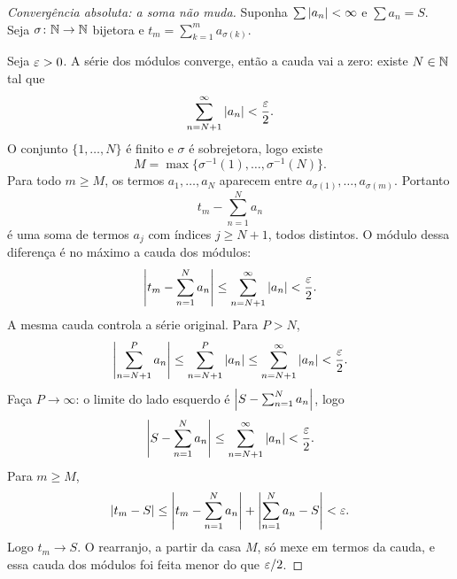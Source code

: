 \documentclass[11pt,a4paper]{article}
\begin{document}
\begin{proof}[Convergência absoluta: a soma não muda]
Suponha \(\sum\left\lvert a_n \right\rvert<\infty\) e \(\sum a_n=S\). Seja \(\sigma\colon\mathbb{N}\to\mathbb{N}\) bijetora e \(t_m=\sum_{k=1}^m a_{\sigma(k)}\).

Seja \(\varepsilon>0\). A série dos módulos converge, então a cauda vai a zero: existe \(N\in\mathbb{N}\) tal que
\[
\sum_{n=N+1}^\infty\left\lvert a_n \right\rvert<\frac{\varepsilon}{2}.
\]
O conjunto \(\{1,\ldots,N\}\) é finito e \(\sigma\) é sobrejetora, logo existe
\[
M=\max\bigl\{\sigma^{-1}(1),\ldots,\sigma^{-1}(N)\bigr\}.
\]
Para todo \(m\ge M\), os termos \(a_1,\ldots,a_N\) aparecem entre \(a_{\sigma(1)},\ldots,a_{\sigma(m)}\). Portanto
\[
t_m-\sum_{n=1}^N a_n
\]
é uma soma de termos \(a_j\) com índices \(j\ge N+1\), todos distintos. O módulo dessa diferença é no máximo a cauda dos módulos:
\[
\left\lvert t_m-\sum_{n=1}^N a_n \right\rvert
\le\sum_{n=N+1}^\infty\left\lvert a_n \right\rvert
<\frac{\varepsilon}{2}.
\]
A mesma cauda controla a série original. Para \(P>N\),
\[
\left\lvert \sum_{n=N+1}^{P} a_n \right\rvert\le\sum_{n=N+1}^{P}\left\lvert a_n \right\rvert\le\sum_{n=N+1}^\infty\left\lvert a_n \right\rvert<\frac{\varepsilon}{2}.
\]
Faça \(P\to\infty\): o limite do lado esquerdo é \(\left\lvert S-\sum_{n=1}^N a_n \right\rvert\), logo
\[
\left\lvert S-\sum_{n=1}^N a_n \right\rvert\le\sum_{n=N+1}^\infty\left\lvert a_n \right\rvert<\frac{\varepsilon}{2}.
\]
Para \(m\ge M\),
\[
\left\lvert t_m-S \right\rvert
\le\left\lvert t_m-\sum_{n=1}^N a_n \right\rvert+\left\lvert \sum_{n=1}^N a_n-S \right\rvert
<\varepsilon.
\]
Logo \(t_m\to S\). O rearranjo, a partir da casa \(M\), só mexe em termos da cauda, e essa cauda dos módulos foi feita menor do que \(\varepsilon/2\).
\end{proof}
\end{document}

